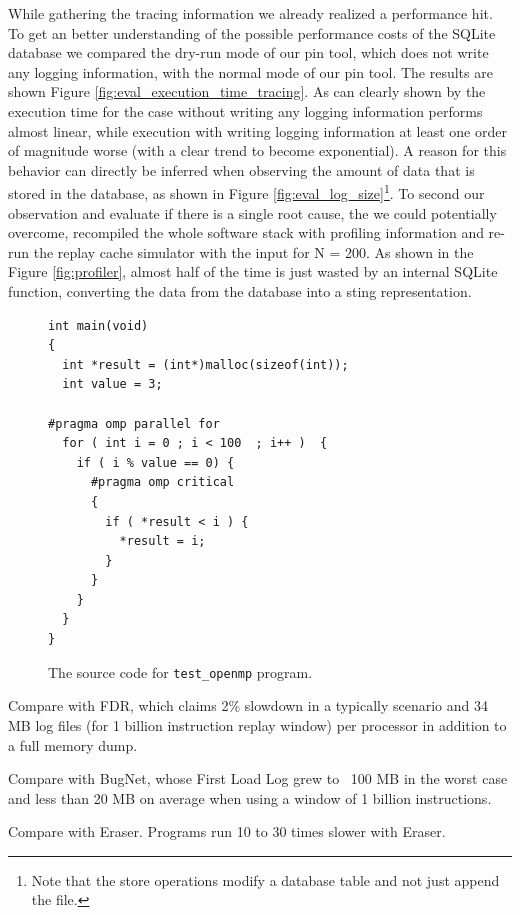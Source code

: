 While gathering the tracing information we already realized a
performance hit. To get an better understanding of the possible
performance costs of the SQLite database we compared the dry-run mode
of our pin tool, which does not write any logging information, with
the normal mode of our pin tool. The results are shown Figure
\ref{fig:eval_execution_time_tracing}. As can clearly shown by the
execution time for the case without writing any logging information
performs almost linear, while execution with writing logging
information at least one order of magnitude worse (with a clear trend
to become exponential). A reason for this behavior can directly be
inferred when observing the amount of data that is stored in the
database, as shown in Figure \ref{fig:eval_log_size}\footnote{Note
  that the store operations modify a database table and not just
  append the file.}. To second our observation and evaluate if there
is a single root cause, the we could potentially overcome, recompiled
the whole software stack with profiling information and re-run the
replay cache simulator with the input for N = 200. As shown in the
Figure \ref{fig:profiler}, almost half of the time is just wasted by
an internal SQLite function, converting the data from the database
into a sting representation.


\begin{figure}
  \lstset{language=C, basicstyle=\small}
  \begin{lstlisting}
int main(void) 
{
  int *result = (int*)malloc(sizeof(int));
  int value = 3;
  
#pragma omp parallel for 
  for ( int i = 0 ; i < 100  ; i++ )  {
    if ( i % value == 0) {
      #pragma omp critical 
      {
        if ( *result < i ) {
          *result = i;
        }
      }
    }
  }
}
  \end{lstlisting}
  \caption{The source code for \texttt{test\_openmp} program.}
  \label{fig:test_openmp}
\end{figure}



Compare with FDR, which claims 2\% slowdown in a typically scenario
and 34 MB log files (for 1 billion instruction replay window)
per processor in addition to a full memory dump.

Compare with BugNet, whose First Load Log grew to ~100 MB in the worst
case and less than 20 MB on average when using a window of 1
billion instructions.

Compare with Eraser.  Programs run 10 to 30 times slower with Eraser.

